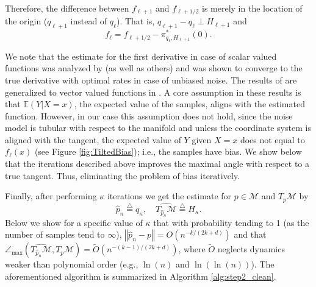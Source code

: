 \documentclass[12pt]{article}
\theoremstyle{remark}
\newcommand{\EE}{\mathbb{E}}
\newcommand{\MM}{\mathcal{M}}
\newcommand{\defeq}{\stackrel{\bigtriangleup}{=}}
\newcommand{\norm}[1]{\left\Vert #1 \right\Vert}
\newcommand{\wtilde}[1]{\widetilde{#1}}
\newcommand{\maxangle}{\angle_{\max}}
\begin{document}
Therefore, the difference between $f_{\ell+1}$ and $f_{\ell +1/2}$ is merely in the location of the origin ($q_{\ell+1}$ instead of $q_\ell$). That is, $q_{\ell+1} - q_\ell \perp H_{\ell+1}$ and
\begin{equation}\label{eq:fell_def}
    f_\ell = f_{\ell + 1/2} - \pi^*_{q_\ell, H_{\ell+1}}(0)
.\end{equation}

We note that the estimate for the first derivative in case of scalar valued functions was analyzed by \cite{stone1980optimal} (as well as others) and was shown to converge to the true derivative with optimal rates in case of unbiased noise. The results of \cite{stone1980optimal} are generalized to vector valued functions in \cite{aizenbud2021VectorEstimation}. 
A core assumption in these results is that $\EE(Y | X=x)$, the expected value of the samples, aligns with the estimated function.
However, in our case this assumption does not hold, since the noise model is tubular with respect to the manifold and unless the coordinate system is aligned with the tangent, the expected value of $Y$ given $X=x$ does not equal to $f_\ell(x)$ (see Figure \ref{fig:TiltedBias}); i.e., the samples have bias.
We show below that the iterations described above improves the maximal angle with respect to a true tangent. 
Thus, eliminating the problem of bias iteratively. 

Finally, after performing $\kappa$ iterations we get the estimate for $ p\in \MM$ and $ T_{ p}\MM $ by 
\begin{equation}
    \hat p_n \defeq q_\kappa ,\quad \widehat{T_{\hat p_n}\MM} \defeq H_\kappa
.\end{equation}
Below we show for a specific value of $\kappa$ that with probability tending to 1 (as the number of samples tend to $\infty$), $ \norm{\hat p_n -  p} =  O(n^{-k/(2k+d)}) $ and that $ \maxangle(\widehat{T_{\hat p_n}\MM}, T_{ p}\MM) = \wtilde O(n^{-(k-1)/(2k+d)}) $, where $ \wtilde O $ neglects dynamics weaker than polynomial order (e.g., $ \ln(n) $ and $ \ln(\ln(n)) $). The aforementioned algorithm is summarized in Algorithm \ref{alg:step2_clean}.
\end{document}
